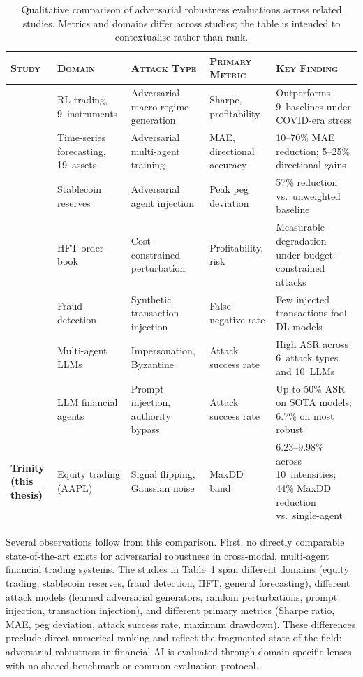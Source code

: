 \begin{table}[h]
\centering
\caption{Qualitative comparison of adversarial robustness evaluations across
  related studies. Metrics and domains differ across studies; the table is
  intended to contextualise rather than rank.}
\label{tab:cross-study}
\small
\begin{tabular}{p{2.8cm}p{2.2cm}p{2.4cm}p{2.0cm}p{3.2cm}}
\toprule
\textsc{Study} & \textsc{Domain} & \textsc{Attack Type} &
  \textsc{Primary Metric} & \textsc{Key Finding} \\
\midrule
\cite{xia_bayesian_2026} &
  RL trading, 9~instruments &
  Adversarial macro-regime generation &
  Sharpe, profitability &
  Outperforms 9~baselines under COVID-era stress \\
\addlinespace
\cite{qiao_multi-agent_2025} &
  Time-series forecasting, 19~assets &
  Adversarial multi-agent training &
  MAE, directional accuracy &
  10--70\% MAE reduction; 5--25\% directional gains \\
\addlinespace
\cite{you_stablecoin_2026} &
  Stablecoin reserves &
  Adversarial agent injection &
  Peak peg deviation &
  57\% reduction vs.\ unweighted baseline \\
\addlinespace
\cite{goldblum_adversarial_2021} &
  HFT order book &
  Cost-constrained perturbation &
  Profitability, risk &
  Measurable degradation under budget-constrained attacks \\
\addlinespace
\cite{fursov_adversarial_2021} &
  Fraud detection &
  Synthetic transaction injection &
  False-negative rate &
  Few injected transactions fool DL models \\
\addlinespace
\cite{kavathekar2025tamas} &
  Multi-agent LLMs &
  Impersonation, Byzantine &
  Attack success rate &
  High ASR across 6~attack types and 10~LLMs \\
\addlinespace
\cite{yang_finvault_2026} &
  LLM financial agents &
  Prompt injection, authority bypass &
  Attack success rate &
  Up to 50\% ASR on SOTA models; 6.7\% on most robust \\
\addlinespace
\textbf{Trinity (this thesis)} &
  Equity trading (AAPL) &
  Signal flipping, Gaussian noise &
  MaxDD band &
  6.23--9.98\% across 10~intensities; 44\% MaxDD reduction vs.\ single-agent \\
\bottomrule
\end{tabular}
\end{table}

Several observations follow from this comparison. First, no directly
comparable state-of-the-art exists for adversarial robustness in cross-modal,
multi-agent financial trading systems. The studies in
Table~\ref{tab:cross-study} span different domains (equity trading, stablecoin
reserves, fraud detection, HFT, general forecasting), different attack models
(learned adversarial generators, random perturbations, prompt injection,
transaction injection), and different primary metrics (Sharpe ratio, MAE,
peg deviation, attack success rate, maximum drawdown). These differences
preclude direct numerical ranking and reflect the fragmented state of the
field: adversarial robustness in financial AI is evaluated through
domain-specific lenses with no shared benchmark or common evaluation protocol.

